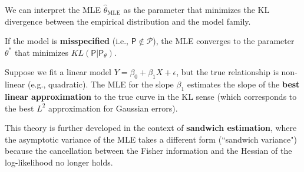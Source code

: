 \begin{remark}
    We can interpret the MLE $\hat{\theta}_{\text{MLE}}$ as the parameter that minimizes the KL divergence between the empirical distribution and the model family.
    
    If the model is \textbf{misspecified} (i.e., $\mathsf{P} \notin \mathcal{P}$), the MLE converges to the parameter $\theta^*$ that minimizes $KL(\mathsf{P}|\mathsf{P}_{\theta})$.
    
\end{remark}
    \begin{ex}
        Suppose we fit a linear model $Y = \beta_0 + \beta_1 X + \epsilon$, but the true relationship is non-linear (e.g., quadratic). The MLE for the slope $\beta_1$ estimates the slope of the \textbf{best linear approximation} to the true curve in the KL sense (which corresponds to the best $L^2$ approximation for Gaussian errors).
    \end{ex}
    
    This theory is further developed in the context of \textbf{sandwich estimation}, where the asymptotic variance of the MLE takes a different form (``sandwich variance") because the cancellation between the Fisher information and the Hessian of the log-likelihood no longer holds.
